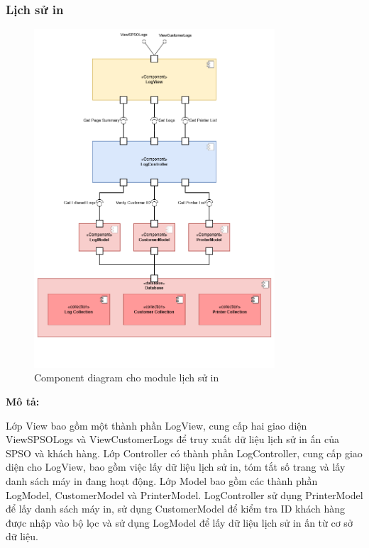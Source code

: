\subsubsection{Lịch sử in}
\begin{figure}[H]
    \begin{center}        
    \includegraphics[width=0.8\textwidth]{Images/Architecture Design/Logging_Component.png}
        \caption{Component diagram cho module lịch sử in}
        \label{fig:arch}
    \end{center}
\end{figure}

\textbf{Mô tả:}\par
Lớp View bao gồm một thành phần LogView, cung cấp hai giao diện ViewSPSOLogs và ViewCustomerLogs để truy xuất dữ liệu lịch sử in ấn của SPSO và khách hàng. Lớp Controller có thành phần LogController, cung cấp giao diện cho LogView, bao gồm việc lấy dữ liệu lịch sử in, tóm tắt số trang và lấy danh sách máy in đang hoạt động. Lớp Model bao gồm các thành phần LogModel, CustomerModel và PrinterModel. LogController sử dụng PrinterModel để lấy danh sách máy in, sử dụng CustomerModel để kiểm tra ID khách hàng được nhập vào bộ lọc và sử dụng LogModel để lấy dữ liệu lịch sử in ấn từ cơ sở dữ liệu.\par



